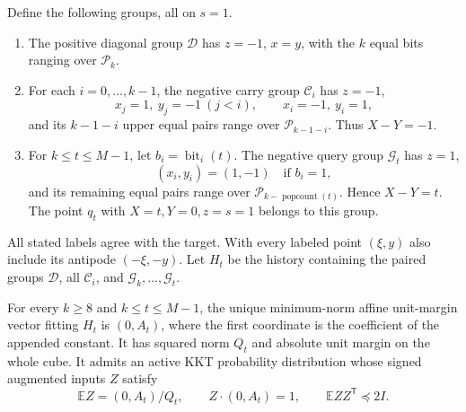 Define the following groups, all on $s=1$.
\begin{enumerate}
\item The positive diagonal group $\mathcal D$ has $z=-1$, $x=y$,
      with the $k$ equal bits ranging over $\mathcal P_k$.
\item For each $i=0,\ldots,k-1$, the negative carry group
      $\mathcal C_i$ has $z=-1$,
      \[
      x_j=1,\ y_j=-1\ (j<i),\qquad x_i=-1,\ y_i=1,
      \]
      and its $k-1-i$ upper equal pairs range over
      $\mathcal P_{k-1-i}$. Thus $X-Y=-1$.
\item For $k\le t\le M-1$, let $b_i=\operatorname{bit}_i(t)$.
      The negative query group $\mathcal G_t$ has $z=1$,
      \[
       (x_i,y_i)=(1,-1)\quad\text{if }b_i=1,
      \]
      and its remaining equal pairs range over
      $\mathcal P_{k-\operatorname{popcount}(t)}$. Hence $X-Y=t$.
      The point $q_t$ with $X=t,Y=0,z=s=1$ belongs to this group.
\end{enumerate}
All stated labels agree with the target. With every labeled point
$(\xi,y)$ also include its antipode $(-\xi,-y)$. Let $H_t$ be the history
containing the paired groups $\mathcal D$, all $\mathcal C_i$, and
$\mathcal G_k,\ldots,\mathcal G_t$.

\begin{lemma}
\label{lem:selector-certificate}
For every $k\ge8$ and $k\le t\le M-1$, the unique minimum-norm affine
unit-margin vector fitting $H_t$ is $(0,A_t)$, where the first coordinate
is the coefficient of the appended constant. It has squared norm $Q_t$
and absolute unit margin on the whole cube. It admits an active KKT
probability distribution whose signed augmented inputs $Z$ satisfy
\[
 \mathbb E Z=(0,A_t)/Q_t,\qquad
 Z\cdot(0,A_t)=1,\qquad
 \mathbb E ZZ^{\mathsf T}\preceq2I.
\]
\end{lemma}

